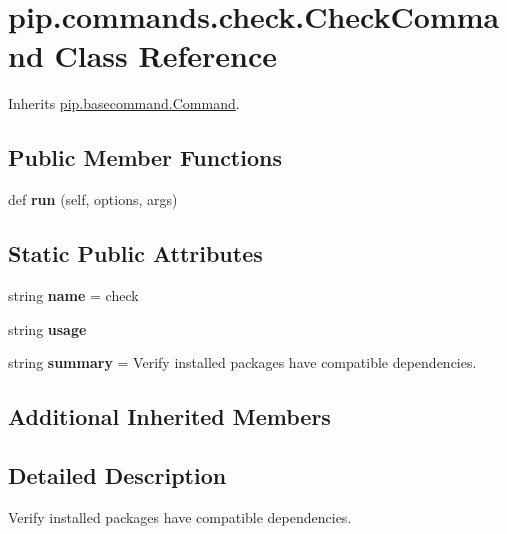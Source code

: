 \hypertarget{classpip_1_1commands_1_1check_1_1_check_command}{}\section{pip.\+commands.\+check.\+Check\+Command Class Reference}
\label{classpip_1_1commands_1_1check_1_1_check_command}


Inherits \hyperlink{classpip_1_1basecommand_1_1_command}{pip.\+basecommand.\+Command}.

\subsection*{Public Member Functions}
\begin{DoxyCompactItemize}
\item 
\mbox{\label{classpip_1_1commands_1_1check_1_1_check_command_a19b57c2afe9202ed8141919c62dc4d1f}} 
def {\bfseries run} (self, options, args)
\end{DoxyCompactItemize}
\subsection*{Static Public Attributes}
\begin{DoxyCompactItemize}
\item 
\mbox{\label{classpip_1_1commands_1_1check_1_1_check_command_a7e1b4690eb23883958eeea91920eb592}} 
string {\bfseries name} = \textquotesingle{}check\textquotesingle{}
\item 
string {\bfseries usage}
\item 
\mbox{\label{classpip_1_1commands_1_1check_1_1_check_command_a0df5288ec9ca9d7610968454ea8fa3b2}} 
string {\bfseries summary} = \textquotesingle{}Verify installed packages have compatible dependencies.\textquotesingle{}
\end{DoxyCompactItemize}
\subsection*{Additional Inherited Members}


\subsection{Detailed Description}
\begin{DoxyVerb}Verify installed packages have compatible dependencies.\end{DoxyVerb}
 

